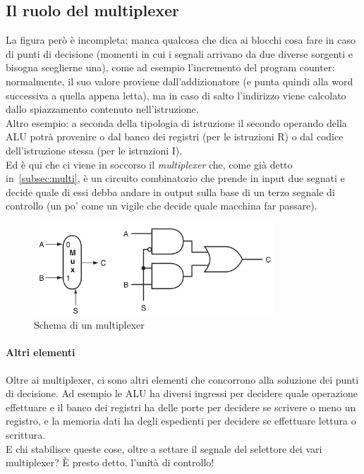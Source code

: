 \documentclass[class=book, crop=false, oneside]{standalone}
\begin{document}
\subsection{Il ruolo del multiplexer}
La  figura però è incompleta; manca qualcosa che dica ai blocchi cosa fare in caso di punti di decisione (momenti in cui i segnali arrivano da due diverse sorgenti e bisogna sceglierne una), come ad esempio l'incremento del program counter: normalmente, il suo valore proviene dall'addizionatore (e punta quindi alla word successiva a quella appena letta), ma in caso di salto l'indirizzo viene calcolato dallo spiazzamento contenuto nell'istruzione.\\
Altro esempio: a seconda della tipologia di istruzione il secondo operando della ALU potrà provenire o dal banco dei registri (per le istruzioni R) o dal codice dell'istruzione stessa (per le istruzioni I).\\
Ed è qui che ci viene in soccorso il \emph{multiplexer} che, come già detto in~\ref{subsec:multi}, è un circuito combinatorio che prende in input due segnati e decide quale di essi debba andare in output sulla base di un terzo segnale di controllo (un po' come un vigile che decide quale macchina far passare).
\begin{figure}[H]
	\centering
	\includegraphics[width=0.8\textwidth,keepaspectratio]{multi}
	\caption{Schema di un multiplexer}
\end{figure}
\paragraph{Altri elementi}
Oltre ai multiplexer, ci sono altri elementi che concorrono alla soluzione dei punti di decisione. Ad esempio le ALU ha diversi ingressi per decidere quale operazione effettuare e il banco dei registri ha delle porte per decidere se scrivere o meno un registro, e la memoria dati ha degli espedienti per decidere se effettuare lettura o scrittura.\\
E chi stabilisce queste cose, oltre a settare il segnale del selettore dei vari multiplexer?  È presto detto, l’unità di controllo!\\
\end{document}
